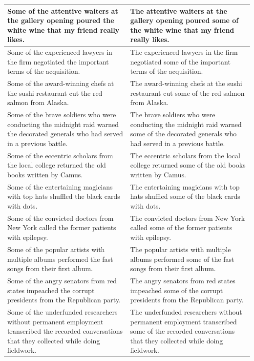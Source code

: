 \documentclass[11pt,a4paper]{article}
\begin{document}
\begin{table}[h]
    \centering
    \begin{tabular}{|p{}|p{}|}
        \hline
        Some of the attentive waiters at the gallery opening poured the white wine that my friend really likes. & The attentive waiters at the gallery opening poured some of the white wine that my friend really likes.  \\
        \hline
        Some of the experienced lawyers in the firm negotiated the important terms of the acquisition. & The experienced lawyers in the firm negotiated some of the important terms of the acquisition. \\
        \hline
        Some of the award-winning chefs at the sushi restaurant cut the red salmon from Alaska. & The award-winning chefs at the sushi restaurant cut some of the red salmon from Alaska. \\
        \hline
        Some of the brave soldiers who were conducting the midnight raid warned the decorated generals who had served in a previous battle. & The brave soldiers who were conducting the midnight raid warned some of the decorated generals who had served in a previous battle. \\
        \hline
        Some of the eccentric scholars from the local college returned the old books written by Camus. & The eccentric scholars from the local college returned some of the old books written by Camus. \\
        \hline
        Some of the entertaining magicians with top hats shuffled the black cards with dots. & The entertaining magicians with top hats shuffled some of the black cards with dots. \\
        \hline
        Some of the convicted doctors from New York called the former patients with epilepsy. & The convicted doctors from New York called some of the former patients with epilepsy. \\
        \hline
        Some of the popular artists with multiple albums performed the fast songs from their first album. & The popular artists with multiple albums performed some of the fast songs from their first album. \\
        \hline
        Some of the angry senators from red states impeached the corrupt presidents from the Republican party. & The angry senators from red states impeached some of the corrupt presidents from the Republican party. \\
        \hline
        Some of the underfunded researchers without permanent employment transcribed the recorded conversations that they collected while doing fieldwork.  & The underfunded researchers without permanent employment transcribed some of the recorded conversations that they collected while doing fieldwork. \\

\end{tabular}
\end{table}
\end{document}
